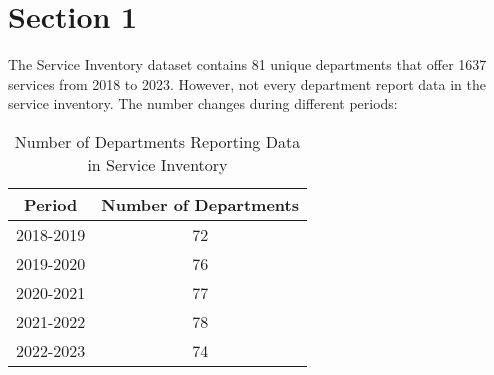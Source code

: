 \section{Section 1}

The Service Inventory dataset contains 81 unique departments that offer 1637 services from 2018 to 2023. However, not every department report data in the service inventory. The number changes during different periods:

\begin{table}
    \centering
    \begin{tabular}{|c|c|}
    \hline
    Period & Number of Departments \\ \hline
    2018-2019 & 72 \\ \hline
    2019-2020 & 76 \\ \hline
    2020-2021 & 77 \\ \hline
    2021-2022 & 78 \\ \hline
    2022-2023 & 74 \\ \hline
    \end{tabular}
    \caption{Number of Departments Reporting Data in Service Inventory}
    \end{table}